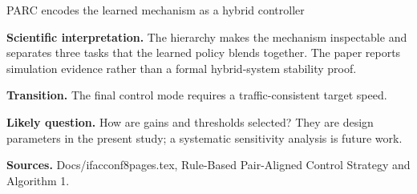 \documentclass[aspectratio=169,11pt]{beamer}
\begin{document}
\begin{frame}[shrink=8]{PARC encodes the learned mechanism as a hybrid controller}
{    \textbf{Scientific interpretation.} The hierarchy makes the mechanism inspectable and separates three tasks that the learned policy blends together. The paper reports simulation evidence rather than a formal hybrid-system stability proof.

    \textbf{Transition.} The final control mode requires a traffic-consistent target speed.

    \textbf{Likely question.} How are gains and thresholds selected? They are design parameters in the present study; a systematic sensitivity analysis is future work.

    \textbf{Sources.} Docs/ifacconf8pages.tex, Rule-Based Pair-Aligned Control Strategy and Algorithm 1.
  }
\end{frame}

\end{document}

